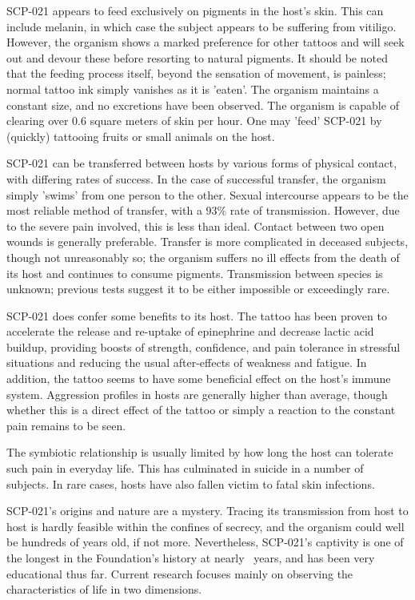 SCP-021 appears to feed exclusively on pigments in the host's skin. This can include melanin, in which case the subject appears to be suffering from vitiligo. However, the organism shows a marked preference for other tattoos and will seek out and devour these before resorting to natural pigments. It should be noted that the feeding process itself, beyond the sensation of movement, is painless; normal tattoo ink simply vanishes as it is 'eaten'. The organism maintains a constant size, and no excretions have been observed. The organism is capable of clearing over 0.6 square meters of skin per hour. One may 'feed' SCP-021 by (quickly) tattooing fruits or small animals on the host.

SCP-021 can be transferred between hosts by various forms of physical contact, with differing rates of success. In the case of successful transfer, the organism simply 'swims' from one person to the other. Sexual intercourse appears to be the most reliable method of transfer, with a 93\% rate of transmission. However, due to the severe pain involved, this is less than ideal. Contact between two open wounds is generally preferable. Transfer is more complicated in deceased subjects, though not unreasonably so; the organism suffers no ill effects from the death of its host and continues to consume pigments. Transmission between species is unknown; previous tests suggest it to be either impossible or exceedingly rare.

SCP-021 does confer some benefits to its host. The tattoo has been proven to accelerate the release and re-uptake of epinephrine and decrease lactic acid buildup, providing boosts of strength, confidence, and pain tolerance in stressful situations and reducing the usual after-effects of weakness and fatigue. In addition, the tattoo seems to have some beneficial effect on the host's immune system. Aggression profiles in hosts are generally higher than average, though whether this is a direct effect of the tattoo or simply a reaction to the constant pain remains to be seen.

The symbiotic relationship is usually limited by how long the host can tolerate such pain in everyday life. This has culminated in suicide in a number of subjects. In rare cases, hosts have also fallen victim to fatal skin infections.

SCP-021's origins and nature are a mystery. Tracing its transmission from host to host is hardly feasible within the confines of secrecy, and the organism could well be hundreds of years old, if not more. Nevertheless, SCP-021's captivity is one of the longest in the Foundation's history at nearly \expunged \ years, and has been very educational thus far. Current research focuses mainly on observing the characteristics of life in two dimensions.